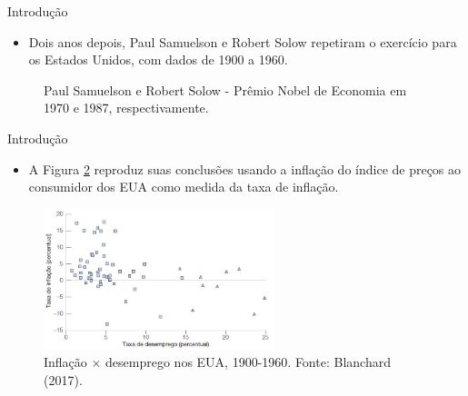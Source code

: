 \documentclass[10pt]{beamer}
\begin{document}
\begin{frame}{Introdução}
    \begin{itemize}
        \item Dois anos depois, Paul Samuelson e Robert Solow repetiram o exercício para os Estados Unidos, com dados de 1900 a 1960.
    \end{itemize}
    \begin{figure}
  \centering
  \qquad
\caption{Paul Samuelson e Robert Solow - Prêmio Nobel de Economia em 1970 e 1987, respectivamente.}
\label{fig3}
\end{figure}
\end{frame}

\begin{frame}{Introdução}
    \begin{itemize}
        \item A Figura \ref{fig4} reproduz suas conclusões usando a inflação do índice de preços ao consumidor dos EUA como medida da taxa de inflação.
    \end{itemize}
    \begin{figure}
        \centering
        \includegraphics[width=0.6\textwidth]{./figures/aula13_fig5.JPG}
        \caption{Inflação $\times$ desemprego nos EUA, 1900-1960. Fonte: Blanchard (2017).}
        \label{fig4}
    \end{figure}
\end{frame}
\end{document}
